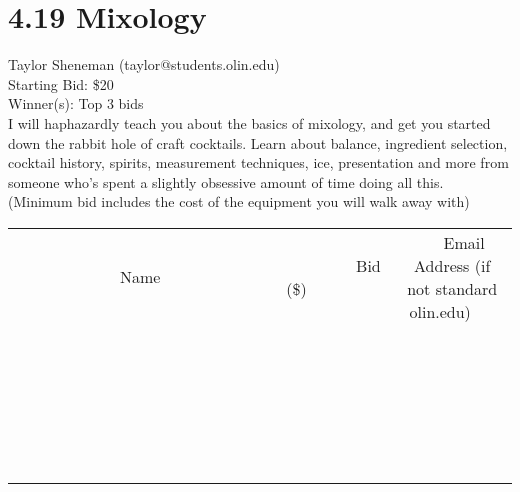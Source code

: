 \documentclass[11pt]{article}
\begin{document}
\section*{4.19 Mixology}
Taylor Sheneman (taylor@students.olin.edu) \\
Starting Bid: \$20 \\
Winner(s): 
Top 3 bids \\
I will haphazardly teach you about the basics of mixology, and get you started down the rabbit hole of craft cocktails. Learn about balance, ingredient selection, cocktail history, spirits, measurement techniques, ice, presentation and more from someone who's spent a slightly obsessive amount of time doing all this. (Minimum bid includes the cost of the equipment you will walk away with) \\[6ex]
\begin{tabular}{c c c}
~~~~~~~~~~~~~Name~~~~~~~~~~~~~ & ~~~~~~~~~Bid (\$)~~~~~~~~~ & ~~~Email Address (if not standard olin.edu)~~~ \\
 & & \\
\hline
 & & \\
\hline
 & & \\
\hline
 & & \\
\hline
 & & \\
\hline
 & & \\
\hline
 & & \\
\hline
 & & \\
\hline
 & & \\
\hline
 & & \\
\hline
 & & \\
\hline
 & & \\
\hline
 & & \\
\hline
 & & \\
\hline
 & & \\
\hline
 & & \\
\hline
 & & \\
\hline
 & & \\
\hline
 & & \\
\hline
 & & \\
\hline
 & & \\
\hline
 & & \\
\hline
 & & \\
\hline
 & & \\
\hline
 & & \\
\hline
 & & \\
\hline
\end{tabular}
\clearpage
\end{document}
